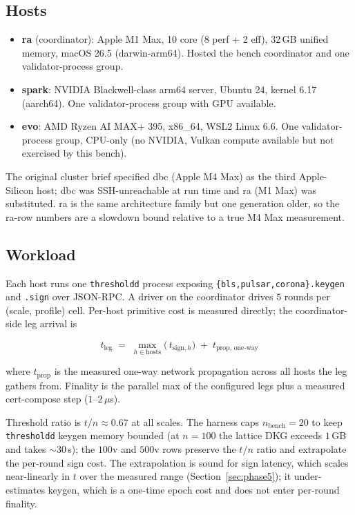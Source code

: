 \documentclass[11pt,a4paper]{article}
\begin{document}
\subsection{Hosts}

\begin{itemize}[leftmargin=2em,nosep]
\item \textbf{ra} (coordinator): Apple M1 Max, 10 core (8 perf + 2
  eff), 32\,GB unified memory, macOS 26.5 (darwin-arm64). Hosted
  the bench coordinator and one validator-process group.
\item \textbf{spark}: NVIDIA Blackwell-class arm64 server, Ubuntu
  24, kernel 6.17 (aarch64). One validator-process group with GPU
  available.
\item \textbf{evo}: AMD Ryzen AI MAX+ 395, x86\_64, WSL2 Linux
  6.6. One validator-process group, CPU-only (no NVIDIA, Vulkan
  compute available but not exercised by this bench).
\end{itemize}

The original cluster brief specified dbc (Apple M4 Max) as the
third Apple-Silicon host; dbc was SSH-unreachable at run time and
ra (M1 Max) was substituted. ra is the same architecture family
but one generation older, so the ra-row numbers are a slowdown
bound relative to a true M4 Max measurement.

\subsection{Workload}

Each host runs one \texttt{thresholdd} process exposing
\texttt{\{bls,pulsar,corona\}.keygen} and \texttt{.sign} over
JSON-RPC. A driver on the coordinator drives $5$ rounds per
(scale, profile) cell. Per-host primitive cost is measured
directly; the coordinator-side leg arrival is

\[
t_{\text{leg}} \;=\; \max_{h \in \text{hosts}}\bigl(\,t_{\text{sign},h}\bigr) \;+\; t_{\text{prop, one-way}}
\]

where $t_{\text{prop}}$ is the measured one-way network propagation
across all hosts the leg gathers from. Finality is the parallel
max of the configured legs plus a measured cert-compose step
($1$--$2\,\mu$s).

Threshold ratio is $t/n \approx 0.67$ at all scales. The harness
caps $n_{\text{bench}}{=}20$ to keep \texttt{thresholdd} keygen
memory bounded (at $n{=}100$ the lattice DKG exceeds $1$\,GB and
takes $\sim 30$\,s); the $100$v and $500$v rows preserve the
$t/n$ ratio and extrapolate the per-round sign cost. The
extrapolation is sound for sign latency, which scales near-linearly
in $t$ over the measured range (Section~\ref{sec:phase5}); it
under-estimates keygen, which is a one-time epoch cost and does
not enter per-round finality.
\end{document}
